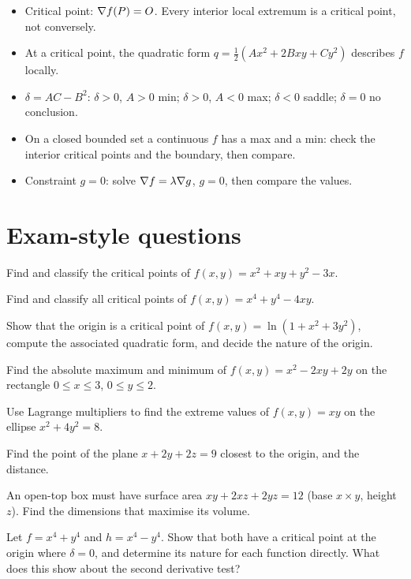 \begin{keyidea}
\begin{itemize}
  \item Critical point: $\nabla f(P)=O$. Every interior local extremum is a critical point, not
  conversely.
  \item At a critical point, the quadratic form $q=\tfrac12(Ax^2+2Bxy+Cy^2)$ describes $f$ locally.
  \item $\delta=AC-B^2$: $\delta>0$, $A>0$ min; $\delta>0$, $A<0$ max; $\delta<0$ saddle; $\delta=0$ no conclusion.
  \item On a closed bounded set a continuous $f$ has a max and a min: check the interior critical
  points and the boundary, then compare.
  \item Constraint $g=0$: solve $\nabla f=\lambda\nabla g$, $g=0$, then compare the values.
\end{itemize}
\end{keyidea}

\section{Exam-style questions}

\begin{exercise}[1]
Find and classify the critical points of $f(x,y)=x^2+xy+y^2-3x$.
\end{exercise}

\begin{exercise}[2]
Find and classify all critical points of $f(x,y)=x^4+y^4-4xy$.
\end{exercise}

\begin{exercise}[1]
Show that the origin is a critical point of $f(x,y)=\ln(1+x^2+3y^2)$, compute the associated
quadratic form, and decide the nature of the origin.
\end{exercise}

\begin{exercise}[2]
Find the absolute maximum and minimum of $f(x,y)=x^2-2xy+2y$ on the rectangle
$0\le x\le3$, $0\le y\le2$.
\end{exercise}

\begin{exercise}[2]
Use Lagrange multipliers to find the extreme values of $f(x,y)=xy$ on the ellipse
$x^2+4y^2=8$.
\end{exercise}

\begin{exercise}[2]
Find the point of the plane $x+2y+2z=9$ closest to the origin, and the distance.
\end{exercise}

\begin{exercise}[3]
An open-top box must have surface area $xy+2xz+2yz=12$ (base $x\times y$, height $z$). Find
the dimensions that maximise its volume.
\end{exercise}

\begin{exercise}[3]
Let $f=x^4+y^4$ and $h=x^4-y^4$. Show that both have a critical point at the origin where
$\delta=0$, and determine its nature for each function directly. What does this show about the
second derivative test?
\end{exercise}
